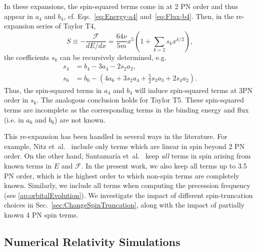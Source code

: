 \documentclass[aps,prd,amsmath,floatfix,twocolumn,superscriptaddress,nofootinbib,showpacs]{revtex4-1}
\begin{document}
In these expansions, the spin-squared terms come in at 2 PN order and
thus appear in $a_4$ and $b_{4}$, cf. Eqs.~\eqref{eq:Energy-a4}
and~\eqref{eq:Flux-b4}.  Then, in the re-expansion series of Taylor
T4, 
\begin{equation}
  \label{eq:rexpand}
  S\equiv -\frac{\mathcal{F}}{dE/dx} = \frac{64 \nu}{5 m} x^5(1+\sum_{k=2}s_{k}x^{k/2}),
\end{equation}
 the coefficients $s_k$ can be recursively determined, e.g. 
\begin{align}
  \label{eq:rexpandsol}
  s_{4} &= b_{4}-3a_{4}-2s_{2}a_{2}, \\
 s_{6} &= b_{6}-(4a_{6}+3s_{2}a_{4}+\frac{5}{2}s_{3}a_{3}+2s_{4}a_{2}).
\end{align}
Thus, the spin-squared terms in $a_4$ and $b_4$ will induce
spin-squared terms at 3PN order in $s_{6}$.  The analogous conclusion
holds for Taylor T5.  These spin-squared terms are incomplete as the
corresponding terms in the binding energy and flux (i.e. in $a_6$ and
$b_6$) are not known.


This re-expansion has been handled in several ways in the
literature. For example, Nitz et~al.~\cite{Nitz:2013mxa} include only
terms which are linear in spin beyond 2 PN order.  On the other hand,
Santamar\'ia et~al.~\cite{Santamaria:2010yb} keep \emph{all} terms in
spin arising from known terms in $E$ and $\mathcal{F}$. In the present
work, we also keep all terms up to 3.5 PN order, which is the highest
order to which non-spin terms are completely known. Similarly, we
include all terms when computing the precession frequency (see
\ref{ap:orbitalEvolution}). We investigate the impact of different
spin-truncation choices in Sec.~\ref{sec:ChangeSpinTruncation}, along
with the impact of partially known 4 PN spin terms.

\subsection{Numerical Relativity Simulations}
\label{sec:NR}
\end{document}
